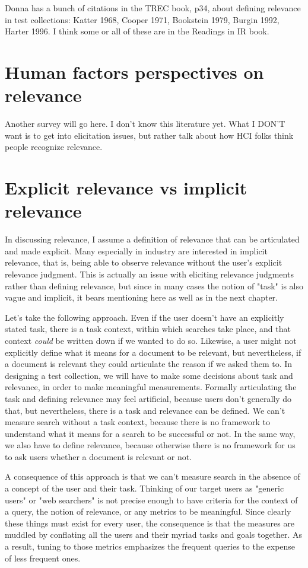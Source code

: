 \documentclass[nobib]{tufte-book}
\begin{document}
Donna has a bunch of citations in the TREC book, p34, about defining relevance in test collections: Katter 1968, Cooper 1971, Bookstein 1979, Burgin 1992, Harter 1996.  I think some or all of these are in the Readings in IR book.

\section{Human factors perspectives on relevance}

Another survey will go here.  I don't know this literature yet.  What I DON'T want is to get into elicitation issues, but rather talk about how HCI folks think people recognize relevance.

\section{Explicit relevance vs implicit relevance}

In discussing relevance, I assume a definition of relevance that can be articulated and made explicit.  Many especially in industry are interested in implicit relevance, that is, being able to observe relevance without the user's explicit relevance judgment.  This is actually an issue with eliciting relevance judgments rather than defining relevance, but since in many cases the notion of "task" is also vague and implicit, it bears mentioning here as well as in the next chapter.

Let's take the following approach.  Even if the user doesn't have an explicitly stated task, there is a task context, within which searches take place, and that context {\em could} be written down if we wanted to do so.  Likewise, a user might not explicitly define what it means for a document to be relevant, but nevertheless, if a document is relevant they could articulate the reason if we asked them to.  In designing a test collection, we will have to make some decisions about task and relevance, in order to make meaningful measurements.  Formally articulating the task and defining relevance may feel artificial, because users don't generally do that, but nevertheless, there is a task and relevance can be defined.  We can't measure search without a task context, because there is no framework to understand what it means for a search to be successful or not.  In the same way, we also have to define relevance, because otherwise there is no framework for us to ask users whether a document is relevant or not.

A consequence of this approach is that we can't measure search in the absence of a concept of the user and their task.  Thinking of our target users as "generic users" or "web searchers" is not precise enough to have criteria for the context of a query, the notion of relevance, or any metrics to be meaningful.  Since clearly these things must exist for every user, the consequence is that the measures are muddled by conflating all the users and their myriad tasks and goals together.  As a result, tuning to those metrics emphasizes the frequent queries to the expense of less frequent ones.
\end{document}
